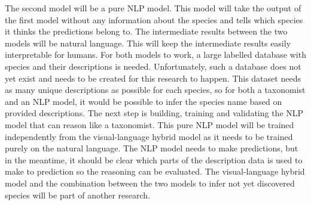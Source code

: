 \documentclass{article}
\begin{document}
The second model will be a pure NLP model.
This model will take the output of the first model without any information about the species and tells which species it thinks the predictions belong to.
The intermediate results between the two models will be natural language.
This will keep the intermediate results easily interpretable for humans.
For both models to work, a large labelled database with species and their descriptions is needed. 
Unfortunately, such a database does not yet exist and needs to be created for this research to happen.
This dataset needs as many unique descriptions as possible for each species, so for both a taxonomist and an NLP model, it would be possible to infer the species name based on provided descriptions.
The next step is building, training and validating the NLP model that can reason like a taxonomist.
This pure NLP model will be trained independently from the visual-language hybrid model as it needs to be trained purely on the natural language. 
The NLP model needs to make predictions, but in the meantime, it should be clear which parts of the description data is used to make to prediction so the reasoning can be evaluated.
The visual-language hybrid model and the combination between the two models to infer not yet discovered species will be part of another research.
\end{document}
